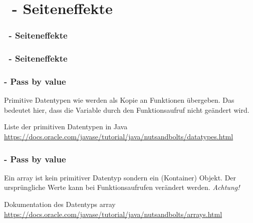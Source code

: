 \def\stitle{\theexercise\ - Seiteneffekte}
\section{\stitle}
\begin{frame}
  \frametitle{\stitle}%
\tableofcontents[current]
\end{frame}

\begin{frame}[t]%
    \frametitle{\stitle}

  

\end{frame}

\begin{frame}[t]%
\frametitle{\theexercise - Pass by value}

Primitive Datentypen wie  werden als Kopie an Funktionen übergeben.
Das bedeutet hier, dass die Variable  durch den Funktionsaufruf nicht geändert wird.


Liste der primitiven Datentypen in Java \textcolor{KITblue}{\url{https://docs.oracle.com/javase/tutorial/java/nutsandbolts/datatypes.html}}
\end{frame}


\begin{frame}[t]%
\frametitle{\theexercise - Pass by value}

Ein array ist kein primitiver Datentyp sondern ein (Kontainer) Objekt.
Der ursprüngliche Werte kann bei Funktionsaufrufen verändert werden.
\emph{Achtung!}


Dokumentation des Datentyps array \textcolor{KITblue}{\url{https://docs.oracle.com/javase/tutorial/java/nutsandbolts/arrays.html}}

\end{frame}
